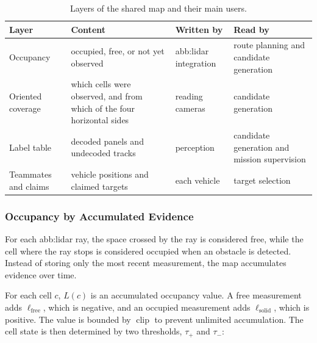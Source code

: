 \begin{table}[!htb]
    \centering
    \caption{Layers of the shared map and their main users.}%
    \label{tab:sys:map-layers}
    \small
    \setlength{\tabcolsep}{4pt}
    \begin{tabular}{@{}>{\raggedright\arraybackslash}p{2.7cm}
            >{\raggedright\arraybackslash}p{4.6cm}
            >{\raggedright\arraybackslash}p{2.8cm}
            >{\raggedright\arraybackslash}p{4.3cm}@{}}
        \toprule
        \textbf{Layer}        & \textbf{Content}                                                       & \textbf{Written by}            & \textbf{Read by}                          \\
        \midrule
        Occupancy             & occupied, free, or not yet observed                                    & \gls{abb:lidar} integration    & route planning and candidate generation   \\
        \addlinespace
        Oriented coverage     & which cells were observed, and from which of the four horizontal sides & reading cameras                & candidate generation                      \\
        \addlinespace
        Label table           & decoded panels and undecoded tracks                                    & perception                     & candidate generation and mission supervision \\
        \addlinespace
        Teammates and claims  & vehicle positions and claimed targets                                  & each vehicle                   & target selection                          \\
        \bottomrule
    \end{tabular}
\end{table}

\FloatBarrier

\subsubsection*{Occupancy by Accumulated Evidence}

For each \gls{abb:lidar} ray, the space crossed by the ray is considered free,
while the cell where the ray stops is considered occupied when an obstacle is
detected. Instead of storing only the most recent measurement, the map
accumulates evidence over time.

For each cell $c$, $L(c)$ is an accumulated occupancy value. A free measurement
adds $\ell_{\mathrm{free}}$, which is negative, and an occupied measurement adds
$\ell_{\mathrm{solid}}$, which is positive. The value is bounded by
$\operatorname{clip}$ to prevent unlimited accumulation. The cell state is then
determined by two thresholds, $\tau_{+}$ and $\tau_{-}$:

